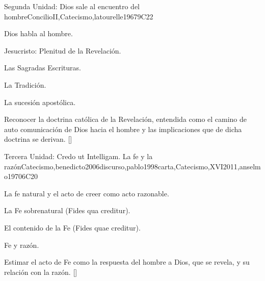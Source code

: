 \begin{syllabus}
\begin{unit}{}{Segunda Unidad: Dios sale al encuentro del hombre}{ConcilioII,Catecismo,latourelle1967}{9}{C22}
\begin{topics}
	\item Dios habla al hombre.
	\item Jesucristo: Plenitud de la Revelación.
	\item Las Sagradas Escrituras.
	\item La Tradición.
	\item La sucesión apostólica.
\end{topics}
\begin{learningoutcomes}
	\item Reconocer la doctrina católica de la Revelación, entendida como el camino de auto comunicación de Dios hacia el hombre y las implicaciones que de dicha doctrina se derivan. [\Familiarity]
\end{learningoutcomes}
\end{unit}

\begin{unit}{}{Tercera Unidad: Credo ut Intelligam. La fe y la razón}{Catecismo,benedicto2006discurso,pablo1998carta,Catecismo,XVI2011,anselmo1970}{6}{C20}
\begin{topics}
	\item La fe natural y el acto de creer como acto razonable.
	\item La Fe sobrenatural (Fides qua creditur).
	\item El contenido de la Fe (Fides quae creditur).
	\item Fe y razón.
\end{topics}
\begin{learningoutcomes}
	\item Estimar el acto de Fe como la respuesta del hombre a Dios, que se revela, y su relación con la razón. [\Familiarity]
\end{learningoutcomes}
\end{unit}


\end{syllabus}
